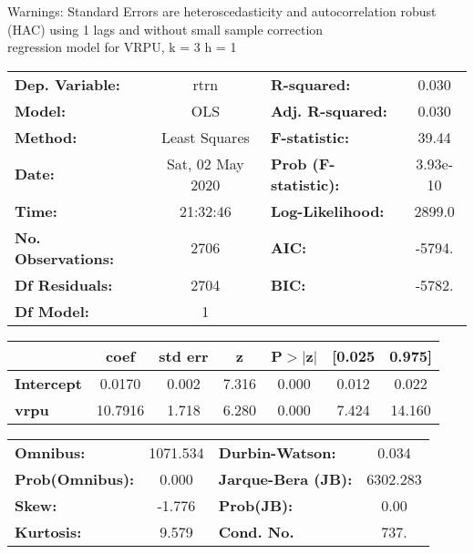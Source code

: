 Warnings: \newline
 [1] Standard Errors are heteroscedasticity and autocorrelation robust (HAC) using 1 lags and without small sample correction\\ 

regression model for VRPU, k = 3 h = 1\begin{center}
\begin{tabular}{lclc}
\toprule
\textbf{Dep. Variable:}    &       rtrn       & \textbf{  R-squared:         } &     0.030   \\
\textbf{Model:}            &       OLS        & \textbf{  Adj. R-squared:    } &     0.030   \\
\textbf{Method:}           &  Least Squares   & \textbf{  F-statistic:       } &     39.44   \\
\textbf{Date:}             & Sat, 02 May 2020 & \textbf{  Prob (F-statistic):} &  3.93e-10   \\
\textbf{Time:}             &     21:32:46     & \textbf{  Log-Likelihood:    } &    2899.0   \\
\textbf{No. Observations:} &        2706      & \textbf{  AIC:               } &    -5794.   \\
\textbf{Df Residuals:}     &        2704      & \textbf{  BIC:               } &    -5782.   \\
\textbf{Df Model:}         &           1      & \textbf{                     } &             \\
\bottomrule
\end{tabular}
\begin{tabular}{lcccccc}
                   & \textbf{coef} & \textbf{std err} & \textbf{z} & \textbf{P$> |$z$|$} & \textbf{[0.025} & \textbf{0.975]}  \\
\midrule
\textbf{Intercept} &       0.0170  &        0.002     &     7.316  &         0.000        &        0.012    &        0.022     \\
\textbf{vrpu}      &      10.7916  &        1.718     &     6.280  &         0.000        &        7.424    &       14.160     \\
\bottomrule
\end{tabular}
\begin{tabular}{lclc}
\textbf{Omnibus:}       & 1071.534 & \textbf{  Durbin-Watson:     } &    0.034  \\
\textbf{Prob(Omnibus):} &   0.000  & \textbf{  Jarque-Bera (JB):  } & 6302.283  \\
\textbf{Skew:}          &  -1.776  & \textbf{  Prob(JB):          } &     0.00  \\
\textbf{Kurtosis:}      &   9.579  & \textbf{  Cond. No.          } &     737.  \\
\bottomrule
\end{tabular}
\end{center}

